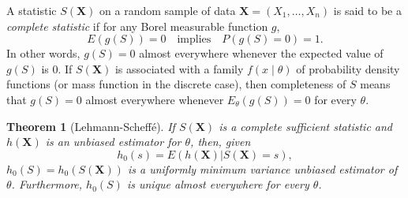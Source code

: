 \documentclass[12pt]{article}
\newtheorem{thm}{Theorem}
\begin{document}

A statistic $S(\boldsymbol{X})$ on a random sample of data $\boldsymbol{X}=(X_1,\ldots,X_n)$ is said to be a \emph{complete statistic} if for any Borel measurable function $g$, $$E(g(S))=0\quad\mbox{implies}\quad P(g(S)=0)=1.$$
In other words, $g(S)=0$ almost everywhere whenever the expected value of $g(S)$ is $0$.  If $S(\boldsymbol{X})$ is associated with a family $f(x\mid \theta)$ of probability density functions (or mass function in the discrete case), then completeness of $S$ means that $g(S)=0$ almost everywhere whenever $E_{\theta}(g(S))=0$ for every $\theta$.

\begin{thm} [Lehmann-Scheff\'e]  If $S(\boldsymbol{X})$ is a complete sufficient statistic and $h(\boldsymbol{X})$ is an unbiased estimator for $\theta$, then, given $$h_0(s) = E(h(\boldsymbol{X}) | S(\boldsymbol{X})=s),$$ $h_0(S)=h_0(S(\boldsymbol{X}))$ is a uniformly minimum variance unbiased estimator of $\theta$.  Furthermore, $h_0(S)$ is unique almost everywhere for every $\theta$.  \end{thm}

\end{document}

